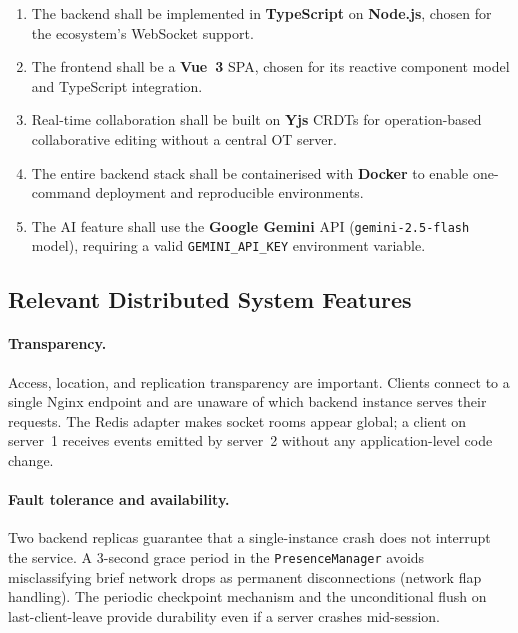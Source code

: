 \documentclass{scrartcl}
\begin{document}
  \begin{enumerate}
    \item[\textbf{IC-1}] The backend shall be implemented in \textbf{TypeScript} on
    \textbf{Node.js}, chosen for the ecosystem's WebSocket support.
    \item[\textbf{IC-2}] The frontend shall be a \textbf{Vue~3} SPA, chosen for its reactive
    component model and TypeScript integration.
    \item[\textbf{IC-3}] Real-time collaboration shall be built on \textbf{Yjs} CRDTs for
    operation-based collaborative editing without a central OT server.
    \item[\textbf{IC-4}] The entire backend stack shall be containerised with \textbf{Docker}
    to enable one-command deployment and reproducible environments.
    \item[\textbf{IC-5}] The AI feature shall use the \textbf{Google Gemini} API
    (\texttt{gemini-2.5-flash} model), requiring a valid \texttt{GEMINI\_API\_KEY} environment
    variable.
  \end{enumerate}

  \subsection{Relevant Distributed System Features}
  \label{ds-features}

  \paragraph{Transparency.}
  Access, location, and replication transparency are important. Clients connect to a single
  Nginx endpoint and are unaware of which backend instance serves their requests. The Redis
  adapter makes socket rooms appear global; a client on server~1 receives events emitted by
  server~2 without any application-level code change.

  \paragraph{Fault tolerance and availability.}
  Two backend replicas guarantee that a single-instance crash does not interrupt the service.
  A 3-second grace period in the \texttt{PresenceManager} avoids misclassifying brief network
  drops as permanent disconnections (network flap handling). The periodic checkpoint mechanism and
  the unconditional flush on last-client-leave provide durability even if a server crashes
  mid-session.
\end{document}
